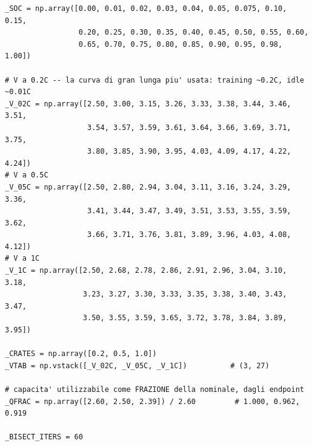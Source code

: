 \documentclass[11pt,a4paper]{article}
\begin{document}
\begin{lstlisting}[style=py,firstnumber=67,caption={\texttt{tesifl/device/battery\_model.py}, lines 67--90}]
_SOC = np.array([0.00, 0.01, 0.02, 0.03, 0.04, 0.05, 0.075, 0.10, 0.15,
                 0.20, 0.25, 0.30, 0.35, 0.40, 0.45, 0.50, 0.55, 0.60,
                 0.65, 0.70, 0.75, 0.80, 0.85, 0.90, 0.95, 0.98, 1.00])

# V a 0.2C -- la curva di gran lunga piu' usata: training ~0.2C, idle ~0.01C
_V_02C = np.array([2.50, 3.00, 3.15, 3.26, 3.33, 3.38, 3.44, 3.46, 3.51,
                   3.54, 3.57, 3.59, 3.61, 3.64, 3.66, 3.69, 3.71, 3.75,
                   3.80, 3.85, 3.90, 3.95, 4.03, 4.09, 4.17, 4.22, 4.24])
# V a 0.5C
_V_05C = np.array([2.50, 2.80, 2.94, 3.04, 3.11, 3.16, 3.24, 3.29, 3.36,
                   3.41, 3.44, 3.47, 3.49, 3.51, 3.53, 3.55, 3.59, 3.62,
                   3.66, 3.71, 3.76, 3.81, 3.89, 3.96, 4.03, 4.08, 4.12])
# V a 1C
_V_1C = np.array([2.50, 2.68, 2.78, 2.86, 2.91, 2.96, 3.04, 3.10, 3.18,
                  3.23, 3.27, 3.30, 3.33, 3.35, 3.38, 3.40, 3.43, 3.47,
                  3.50, 3.55, 3.59, 3.65, 3.72, 3.78, 3.84, 3.89, 3.95])

_CRATES = np.array([0.2, 0.5, 1.0])
_VTAB = np.vstack([_V_02C, _V_05C, _V_1C])          # (3, 27)

# capacita' utilizzabile come FRAZIONE della nominale, dagli endpoint
_QFRAC = np.array([2.60, 2.50, 2.39]) / 2.60         # 1.000, 0.962, 0.919

_BISECT_ITERS = 60
\end{lstlisting}
\end{document}
